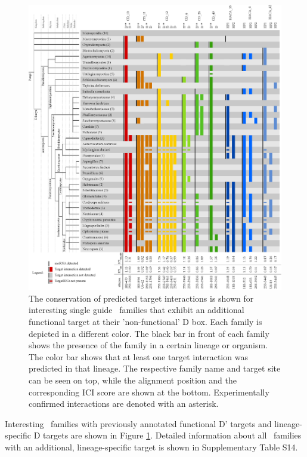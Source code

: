 \begin{figure}
  \centering
  \includegraphics[width=\textwidth]{pics/conservation_lineage_specific_targets.eps}
  \caption{The conservation of predicted target interactions is shown for
    interesting single guide \cd\ families that exhibit an additional
    functional target at their 'non-functional' D box. Each family is
    depicted in a different color. The black bar in front of each family
    shows the presence of the family in a certain lineage or organism. The
    color bar shows that at least one target interaction was predicted in
    that lineage. The respective family name and target site can be seen on
    top, while the alignment position and the corresponding ICI score are
    shown at the bottom. Experimentally confirmed interactions are denoted
    with an asterisk.}
  \label{fig:additional_targets}
\end{figure}

Interesting \cd\ families with previously annotated functional D' targets
and lineage-specific D targets are shown in Figure
\ref{fig:additional_targets}. Detailed information about all \sno\ families
with an additional, lineage-specific target is shown in Supplementary Table
S14.


